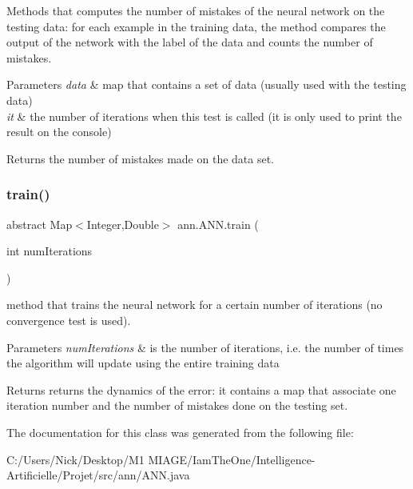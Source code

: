 Methods that computes the number of mistakes of the neural network on the testing data\+: for each example in the training data, the method compares the output of the network with the label of the data and counts the number of mistakes. 
\begin{DoxyParams}{Parameters}
{\em data} & map that contains a set of data (usually used with the testing data) \\
\hline
{\em it} & the number of iterations when this test is called (it is only used to print the result on the console) \\
\hline
\end{DoxyParams}
\begin{DoxyReturn}{Returns}
the number of mistakes made on the data set. 
\end{DoxyReturn}
\mbox{\label{classann_1_1_a_n_n_a9e4c633b9b365c89245bbb441c86d71c}} 
\subsubsection{\texorpdfstring{train()}{train()}}
{\footnotesize\ttfamily abstract Map$<$Integer,Double$>$ ann.\+A\+N\+N.\+train (\begin{DoxyParamCaption}\item[{int}]{num\+Iterations }\end{DoxyParamCaption})\hspace{0.3cm}{\ttfamily [abstract]}}

method that trains the neural network for a certain number of iterations (no convergence test is used). 
\begin{DoxyParams}{Parameters}
{\em num\+Iterations} & is the number of iterations, i.\+e. the number of times the algorithm will update using the entire training data \\
\hline
\end{DoxyParams}
\begin{DoxyReturn}{Returns}
returns the dynamics of the error\+: it contains a map that associate one iteration number and the number of mistakes done on the testing set. 
\end{DoxyReturn}


The documentation for this class was generated from the following file\+:\begin{DoxyCompactItemize}
\item 
C\+:/\+Users/\+Nick/\+Desktop/\+M1 M\+I\+A\+G\+E/\+Iam\+The\+One/\+Intelligence-\/\+Artificielle/\+Projet/src/ann/A\+N\+N.\+java\end{DoxyCompactItemize}
